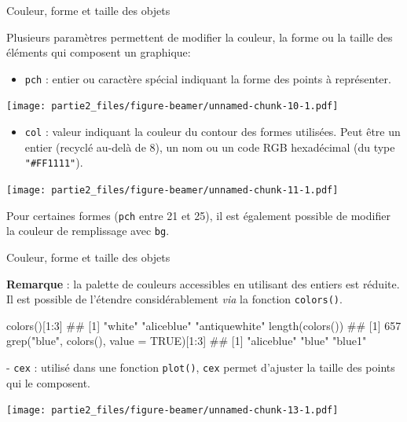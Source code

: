 \documentclass[12pt,ignorenonframetext,]{beamer}
\newenvironment{Shaded}{}{}
\newcommand{\KeywordTok}[1]{\textcolor[rgb]{0.00,0.00,1.00}{#1}}
\newcommand{\DataTypeTok}[1]{#1}
\newcommand{\DecValTok}[1]{#1}
\newcommand{\StringTok}[1]{\textcolor[rgb]{0.00,0.50,0.50}{#1}}
\newcommand{\OtherTok}[1]{\textcolor[rgb]{1.00,0.25,0.00}{#1}}
\newcommand{\OperatorTok}[1]{#1}
\newcommand{\NormalTok}[1]{#1}
\providecommand{\tightlist}{%
  \setlength{\itemsep}{0pt}\setlength{\parskip}{0pt}}
\renewenvironment{Shaded}{\begin{snugshade}}{\end{snugshade}}
\begin{document}
\begin{frame}[fragile]{Couleur, forme et taille des objets}

Plusieurs paramètres permettent de modifier la couleur, la forme ou la
taille des éléments qui composent un graphique:

\begin{itemize}
\tightlist
\item
  \pause \texttt{pch} : entier ou caractère spécial indiquant la forme
  des points à représenter.
\end{itemize}

\texttt{[image: partie2\_files/figure-beamer/unnamed-chunk-10-1.pdf]}

\begin{itemize}
\tightlist
\item
  \pause \texttt{col} : valeur indiquant la couleur du contour des
  formes utilisées. Peut être un entier (recyclé au-delà de 8), un nom
  ou un code RGB hexadécimal (du type \texttt{"\#FF1111"}). \small  
\end{itemize}

\texttt{[image: partie2\_files/figure-beamer/unnamed-chunk-11-1.pdf]}

Pour certaines formes (\texttt{pch} entre 21 et 25), il est également
possible de modifier la couleur de remplissage avec \texttt{bg}.

\end{frame}

\begin{frame}[fragile]{Couleur, forme et taille des objets}

\textbf{Remarque} : la palette de couleurs accessibles en utilisant des
entiers est réduite. Il est possible de l'étendre considérablement
\emph{via} la fonction \texttt{colors()}.

\small

\begin{Shaded}
\begin{Highlighting}[]
\KeywordTok{colors}\NormalTok{()[}\DecValTok{1}\OperatorTok{:}\DecValTok{3}\NormalTok{]}
\NormalTok{  ## [1] "white"        "aliceblue"    "antiquewhite"}
\KeywordTok{length}\NormalTok{(}\KeywordTok{colors}\NormalTok{())}
\NormalTok{  ## [1] 657}
\KeywordTok{grep}\NormalTok{(}\StringTok{"blue"}\NormalTok{, }\KeywordTok{colors}\NormalTok{(), }\DataTypeTok{value =} \OtherTok{TRUE}\NormalTok{)[}\DecValTok{1}\OperatorTok{:}\DecValTok{3}\NormalTok{]}
\NormalTok{  ## [1] "aliceblue" "blue"      "blue1"}
\end{Highlighting}
\end{Shaded}

\pause \normalsize
- \texttt{cex} : utilisé dans une fonction \texttt{plot()}, \texttt{cex}
permet d'ajuster la taille des points qui le composent.

\texttt{[image: partie2\_files/figure-beamer/unnamed-chunk-13-1.pdf]}

\end{frame}
\end{document}
